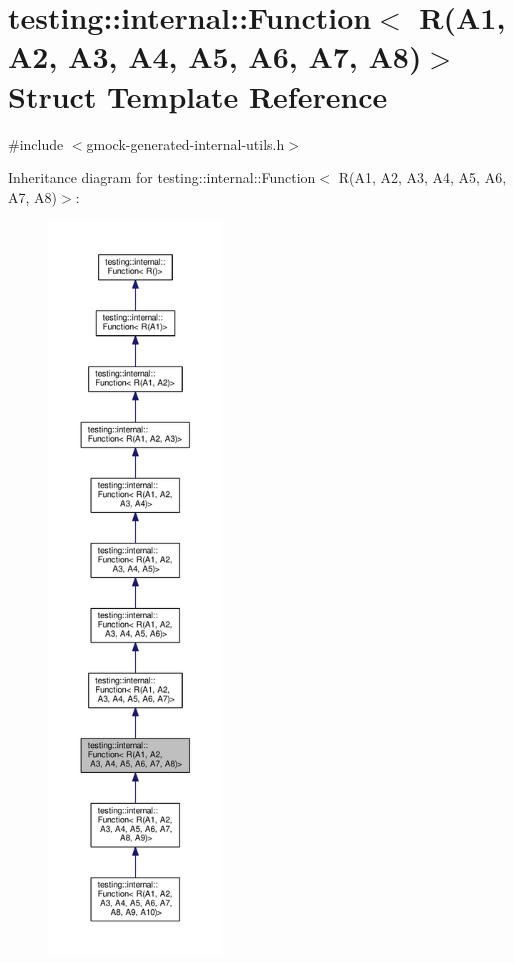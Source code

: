 \hypertarget{structtesting_1_1internal_1_1Function_3_01R_07A1_00_01A2_00_01A3_00_01A4_00_01A5_00_01A6_00_01A7_00_01A8_08_4}{}\section{testing\+:\+:internal\+:\+:Function$<$ R(A1, A2, A3, A4, A5, A6, A7, A8)$>$ Struct Template Reference}
\label{structtesting_1_1internal_1_1Function_3_01R_07A1_00_01A2_00_01A3_00_01A4_00_01A5_00_01A6_00_01A7_00_01A8_08_4}


{\ttfamily \#include $<$gmock-\/generated-\/internal-\/utils.\+h$>$}



Inheritance diagram for testing\+:\+:internal\+:\+:Function$<$ R(A1, A2, A3, A4, A5, A6, A7, A8)$>$\+:
\nopagebreak
\begin{figure}[H]
\begin{center}
\leavevmode
\includegraphics[height=550pt]{structtesting_1_1internal_1_1Function_3_01R_07A1_00_01A2_00_01A3_00_01A4_00_01A5_00_01A6_00_01A7_00_01A8_08_4__inherit__graph}
\end{center}
\end{figure}


